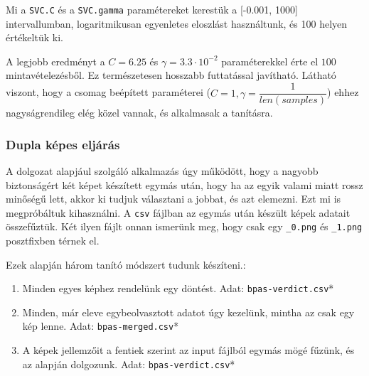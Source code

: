 Mi a \texttt{SVC.C} és a \texttt{SVC.gamma} paramétereket kerestük a [-0.001, 1000] intervallumban,  logaritmikusan egyenletes eloszlást használtunk, és 100 helyen értékeltük ki.
%
%
%
%
%	
%	
%	
%	
%	


A legjobb eredményt a $ C=6.25 $ és $ \gamma = 3.3 \cdot 10^{-2} $ paraméterekkel érte el $ 100 $
mintavételezésből. Ez természetesen hosszabb futtatással javítható. Látható viszont, hogy a csomag
beépített paraméterei ($ C=1 , \gamma =\dfrac{1}{len(samples)} $) ehhez nagyságrendileg elég közel vannak,
és alkalmasak a tanításra.


\subsubsection{Dupla képes eljárás}
\label{sec:dupla.kepes.eljaras}

A dolgozat alapjául szolgáló alkalmazás úgy működött, hogy a nagyobb biztonságért két képet készített
egymás után, hogy ha az egyik valami miatt rossz minőségű lett, akkor ki tudjuk választani a jobbat, 
és azt elemezni. Ezt mi is megpróbáltuk kihasználni. A \texttt{csv} fájlban az egymás után készült képek adatait
összefűztük. Két ilyen fájlt onnan ismerünk meg, hogy csak egy \texttt{\_0.png} és \texttt{\_1.png}
posztfixben térnek el.

Ezek alapján három tanító módszert tudunk készíteni.:
\begin{enumerate}
	\item
	Minden egyes képhez rendelünk egy döntést.
	Adat: \texttt{bpas-verdict.csv}*
	\item 
	Minden, már eleve egybeolvasztott adatot úgy kezelünk, mintha az csak 
	egy kép lenne. Adat: \texttt{bpas-merged.csv}*
	
	\item 
	A képek jellemzőit a fentiek szerint az input fájlból egymás mögé 
	fűzünk, és az alapján dolgozunk.
	Adat: \texttt{bpas-verdict.csv}*
\end{enumerate}

